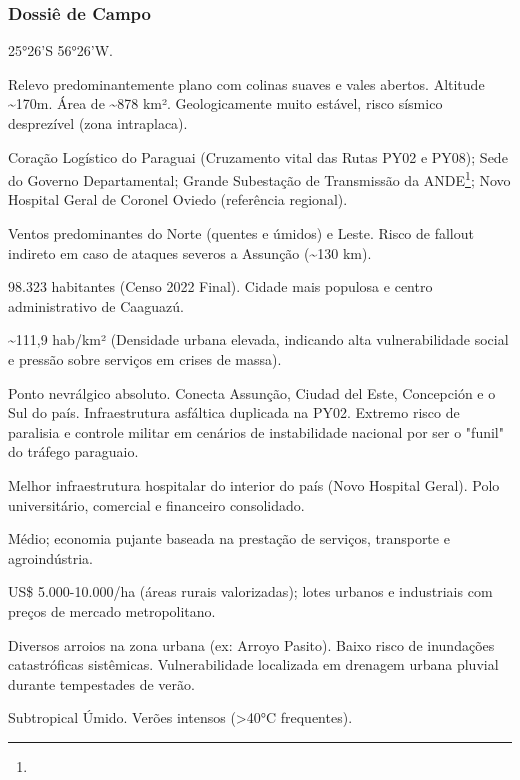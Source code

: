 \subsubsection{Dossiê de Campo}
\begin{description}[style=nextline,leftmargin=0.5cm,font=\bfseries]
\item[Coordenadas]  25°26'S 56°26'W.
\item[Topografia]  Relevo predominantemente plano com colinas suaves e vales abertos. Altitude \textasciitilde 170m. Área de \textasciitilde 878 km². Geologicamente muito estável, risco sísmico desprezível (zona intraplaca).
\item[Alvos Estratégicos]  Coração Logístico do Paraguai (Cruzamento vital das Rutas PY02 e PY08); Sede do Governo Departamental; Grande Subestação de Transmissão da ANDE\footnote{\fineANDE}; Novo Hospital Geral de Coronel Oviedo (referência regional).
\item[Fallout]  Ventos predominantes do Norte (quentes e úmidos) e Leste. Risco de fallout indireto em caso de ataques severos a Assunção (\textasciitilde 130 km).
\item[População]  98.323 habitantes (Censo 2022 Final). Cidade mais populosa e centro administrativo de Caaguazú.
\item[Densidade]  \textasciitilde 111,9 hab/\allowbreak km² (Densidade urbana elevada, indicando alta vulnerabilidade social e pressão sobre serviços em crises de massa).
\item[Vias de Acesso]  Ponto nevrálgico absoluto. Conecta Assunção, Ciudad del Este, Concepción e o Sul do país. Infraestrutura asfáltica duplicada na PY02. Extremo risco de paralisia e controle militar em cenários de instabilidade nacional por ser o "funil" do tráfego paraguaio.
\item[Serviços]  Melhor infraestrutura hospitalar do interior do país (Novo Hospital Geral). Polo universitário, comercial e financeiro consolidado.
\item[Custo de Vida]  Médio; economia pujante baseada na prestação de serviços, transporte e agroindústria.
\item[Preço da Terra]  US\$ 5.000-10.000/\allowbreak ha (áreas rurais valorizadas); lotes urbanos e industriais com preços de mercado metropolitano.
\item[Hidrologia]  Diversos arroios na zona urbana (ex: Arroyo Pasito). Baixo risco de inundações catastróficas sistêmicas. Vulnerabilidade localizada em drenagem urbana pluvial durante tempestades de verão.
\item[Clima]  Subtropical Úmido. Verões intensos (>40°C frequentes).

\end{description}
